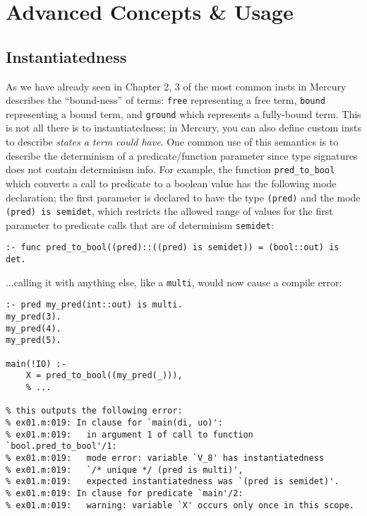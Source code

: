 \chapter{Advanced Concepts \& Usage}


\section{Instantiatedness}

As we have already seen in Chapter 2, 3 of the most common insts in Mercury describes the ``bound-ness'' of terms: \texttt{free} representing a free term, \texttt{bound} representing a bound term, and \texttt{ground} which represents a fully-bound term. This is not all there is to instantiatedness; in Mercury, you can also define custom insts to describe \textit{states a term could have}. One common use of this semantics is to describe the determinism of a predicate/function parameter since type signatures does not contain determinism info. For example, the function \texttt{pred_to_bool} which converts a call to predicate to a boolean value has the following mode declaration; the first parameter is declared to have the type \texttt{(pred)} and the
mode \texttt{(pred) is semidet}, which restricts the allowed range of values for the first parameter to predicate calls that are of determinism \texttt{semidet}:

\begin{lstlisting}[language=Mercury]
:- func pred_to_bool((pred)::((pred) is semidet)) = (bool::out) is det.
\end{lstlisting}

...calling it with anything else, like a \texttt{multi}, would now cause a compile error:

\begin{lstlisting}[language=Mercury]
:- pred my_pred(int::out) is multi.
my_pred(3).
my_pred(4).
my_pred(5).

main(!IO) :-
	X = pred_to_bool((my_pred(_))),
    % ...

% this outputs the following error:
% ex01.m:019: In clause for `main(di, uo)':
% ex01.m:019:   in argument 1 of call to function `bool.pred_to_bool'/1:
% ex01.m:019:   mode error: variable `V_8' has instantiatedness
% ex01.m:019:   `/* unique */ (pred is multi)',
% ex01.m:019:   expected instantiatedness was `(pred is semidet)'.
% ex01.m:019: In clause for predicate `main'/2:
% ex01.m:019:   warning: variable `X' occurs only once in this scope.
\end{lstlisting}

